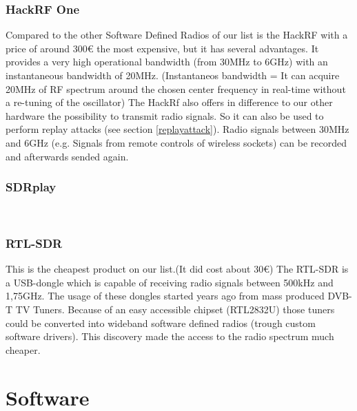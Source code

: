 \documentclass[conference]{IEEEtran}
\begin{document}
\subsubsection{HackRF One}
Compared to the other Software Defined Radios of our list is the HackRF with a price of around 300€ the most expensive, but it has several advantages. It provides a very high operational bandwidth (from 30MHz to 6GHz) with an instantaneous bandwidth of 20MHz. (Instantaneos bandwidth = It can acquire 20MHz of RF spectrum around the chosen center frequency in real-time without a re-tuning of the oscillator) \cite[2.5]{Mishra2014} The HackRf also offers in difference to our other hardware the possibility to transmit radio signals. So it can also be used to perform replay attacks (see section \ref{replayattack}). Radio signals between 30MHz and 6GHz (e.g. Signals from remote controls of wireless sockets) can be recorded and afterwards sended again.  \\

\subsubsection{SDRplay}
\cite{sdrplay}
\\
\subsubsection{RTL-SDR}
This is the cheapest product on our list.(It did cost about 30€) The RTL-SDR is a USB-dongle which is capable of receiving radio signals  between 500kHz and 1,75GHz.  The  usage of these dongles started years ago from mass produced DVB-T TV Tuners. Because of an easy accessible chipset (RTL2832U) those tuners could be converted into wideband software defined radios (trough custom software drivers). This discovery made the access to the radio spectrum much cheaper. \cite{rtl-sdr}


\section{Software} %
\end{document}
